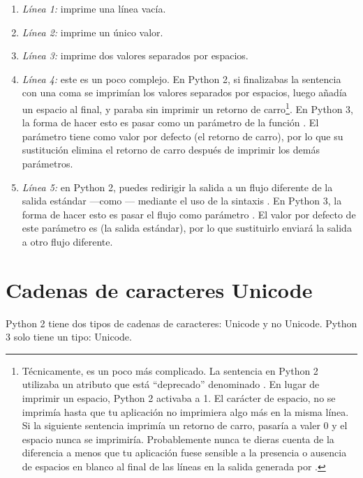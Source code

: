 \begin{enumerate}
  \item \emph{Línea 1:} imprime una línea vacía.
  \item \emph{Línea 2:} imprime un único valor.
  \item \emph{Línea 3:} imprime dos valores separados por espacios.
  \item \emph{Línea 4:} este es un poco complejo. En Python 2, si finalizabas la sentencia  con una coma se imprimían los valores separados por espacios, luego añadía un espacio al final, y paraba sin imprimir un retorno de carro\footnote{Técnicamente, es un poco más complicado. La sentencia  en Python 2 utilizaba un atributo que está ``deprecado'' denominado . En lugar de imprimir un espacio, Python 2 activaba  a 1. El carácter de espacio, no se imprimía hasta que tu aplicación no imprimiera algo más en la misma línea. Si la siguiente sentencia  imprimía un retorno de carro,  pasaría a valer 0 y el espacio nunca se imprimiría. Probablemente nunca te dieras cuenta de la diferencia a menos que tu aplicación fuese sensible a la presencia o ausencia de espacios en blanco al final de las líneas en la salida generada por .}. En Python 3, la forma de hacer esto es pasar  como un parámetro de la función . El parámetro  tiene como valor por defecto  (el retorno de carro), por lo que su sustitución elimina el retorno de carro después de imprimir los demás parámetros.

  \item \emph{Línea 5:} en Python 2, puedes redirigir la salida a un flujo diferente de la salida estándar ---como --- mediante el uso de la sintaxis . En Python 3, la forma de hacer esto es pasar el flujo como parámetro . El valor por defecto de este parámetro es  (la salida estándar), por lo que sustituirlo enviará la salida a otro flujo diferente.

\end{enumerate}


\section{Cadenas de caracteres Unicode}

Python 2 tiene dos tipos de cadenas de caracteres: Unicode y no Unicode. Python 3 solo tiene un tipo: Unicode.


